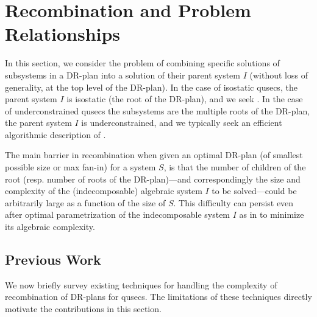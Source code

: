 \section{Recombination and Problem Relationships}
\label{sec:recomb}
%
In this section, we consider the  problem of combining specific solutions of subsystems in a DR-plan into a solution of their parent system $I$ (without loss of generality, at the top level of the DR-plan). In the case of isostatic qusecs, the parent system $I$ is isostatic (the root of the DR-plan), and we seek . In the case of underconstrained qusecs the subsystems are the multiple roots of the DR-plan, the parent system $I$ is underconstrained, and we typically seek an efficient algorithmic description of .

The main barrier in recombination when given an optimal DR-plan  (of smallest possible size or max fan-in) for a system $S$,  is that the number of children of the root  (resp. number of roots of the DR-plan)---and correspondingly the  size and complexity of the (indecomposable) algebraic system $I$ to be solved---could be arbitrarily large as a function of the size of $S$. This difficulty can persist even after optimal parametrization of the indecomposable system $I$ as in \cite{sitharam2010optimized} to minimize its algebraic complexity.

\subsection{Previous Work}
We now briefly survey existing techniques for handling the complexity of recombination of DR-plans for qusecs. The limitations of these techniques directly motivate the contributions in this section.

